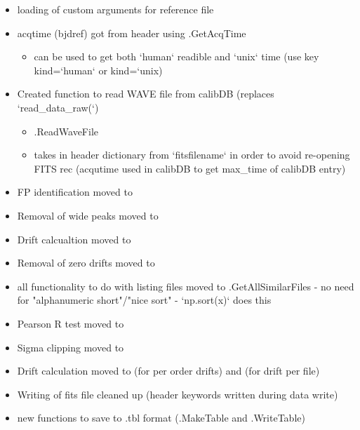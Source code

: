 \begin{itemize}
\item loading of custom arguments for reference file

\item acqtime (bjdref) got from header using \spirouImage.GetAcqTime
	\begin{itemize}
	\item can be used to get both `human` readible and `unix` time (use key kind=`human` or kind=`unix)
	\end{itemize}

\item Created function to read WAVE file from calibDB (replaces `read\_data\_raw(`)
	\begin{itemize}
	\item \spirouImage.ReadWaveFile
	\item takes in header dictionary from `fitsfilename` in order to avoid re-opening FITS rec (acqutime used in calibDB to get max\_time of calibDB entry) 
	\end{itemize}

\item FP identification moved to 

\item Removal of wide peaks moved to 

\item Drift calcualtion moved to 

\item Removal of zero drifts moved to 

\item all functionality to do with listing files moved to \spirouImage{\hskip 0pt}.GetAllSimilarFiles - no need for "alphanumeric short"/"nice sort" - `np.sort(x)` does this
    
\item Pearson R test moved to 

\item Sigma clipping moved to 

\item Drift calculation moved to  (for per order drifts) and  (for drift per file)

\item Writing of fits file cleaned up (header keywords written during data write)

\item new functions to save to .tbl format (\spirouImage.MakeTable and \spirouImage.WriteTable)

\end{itemize}